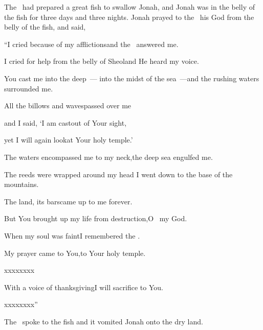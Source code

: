 
\begin{inparaenum}
  The \lord\ had prepared%
  a great fish%
  to swallow Jonah, and Jonah was in the belly of the fish for three days and three nights.%
   Jonah prayed to the \lord\ his God from the belly of the fish,%
   and said,\smallskip%

  \pd{}``I cried because of my afflictions\pa{}and the \lord\ answered me.%

  \pd{}I cried for help from the belly of Sheol\pa{}and He heard my voice.%

  \pc{} You cast me into the deep~--- into the midst of the sea~---\pa{}and the rushing%
  waters surrounded me.%

  \pd{}All the billows and waves\pa{}passed over me%

  \pc{} and I said, `I am cast\pa{}out of Your sight,%

  \pd{}yet I will again look\pa{}at Your holy temple.'%

  \pc{} The waters encompassed me to my neck,\pa{}the deep sea engulfed me.%

  \pd{}The reeds%
  were wrapped around my head\pa{} I went down to the base of the mountains.%

  \pd{}The land, its bars\pa{}came up to me forever.%

  \pd{}But You brought up my life from destruction,\pa{}O \lord\ my God.%

  \pc{} When my soul was faint\pa{}I remembered the \lord.%

  \pd{}My prayer came to You,\pa{}to Your holy temple.%

  \pc{} xxxx\pa{}xxxx%

  \pc{} With a voice of thanksgiving\pa{}I will sacrifice to You.%

  \pd{}xxxx\pa{}xxxx''\smallskip%

   The \lord\ spoke to the fish and it vomited Jonah onto the dry land.%
\end{inparaenum}
